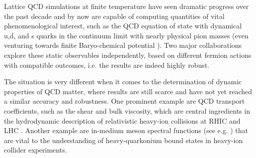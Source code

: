 \documentclass[epj]{webofc}
\begin{document}
Lattice QCD simulations at finite temperature have seen dramatic progress over the past decade and by now are capable of computing quantities of vital phenomenological interest, such as the QCD equation of state with dynamical u,d, and s quarks in the continuum limit \cite{Borsanyi:2016ksw,Bazavov:2014pvz,Borsanyi:2013bia} with nearly physical pion masses (even venturing towards finite Baryo-chemical potential \cite{Bazavov:2017dus,Gunther:2016vcp}). Two major collaborations explore these static observables independently, based on different fermion actions with compatible outcomes, i.e. the results are indeed highly robust.

The situation is very different when it comes to the determination of dynamic properties of QCD matter, where results are still scarce and have not yet reached a similar accuracy and robustness. One prominent example are QCD transport coefficients, such as the shear \cite{Pasztor:2016wxq,Mages:2015rea,Meyer:2009jp,Meyer:2007ic} and bulk \cite{Meyer:2007dy} viscosity, which are central ingredients in the hydrodynamic description of relativistic heavy-ion collisions at RHIC and LHC \cite{Bernhard:2016tnd}. Another example are in-medium meson spectral functions (see e.g. \cite{Kim:2014iga,Aarts:2014cda}) that are vital to the understanding of heavy-quarkonium bound states in heavy-ion collider experiments.
\end{document}

